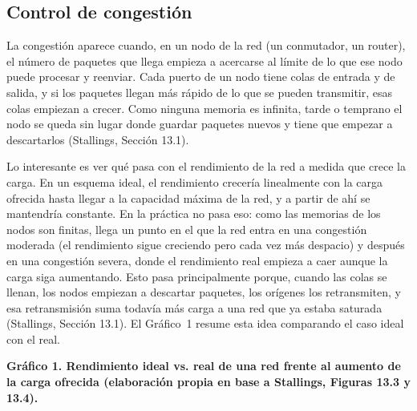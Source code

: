 \documentclass[11pt,a4paper]{article}
\newcommand{\figcaption}[1]{\par\noindent\footnotesize\textbf{#1}\par\vspace{0.4cm}}
\begin{document}
\subsection{Control de congesti\'on}
\label{sec:congestion}

La congesti\'on aparece cuando, en un nodo de la red (un conmutador, un router), el n\'umero de paquetes que llega empieza a acercarse al l\'imite de lo que ese nodo puede procesar y reenviar. Cada puerto de un nodo tiene colas de entrada y de salida, y si los paquetes llegan m\'as r\'apido de lo que se pueden transmitir, esas colas empiezan a crecer. Como ninguna memoria es infinita, tarde o temprano el nodo se queda sin lugar donde guardar paquetes nuevos y tiene que empezar a descartarlos (Stallings, Secci\'on 13.1).

Lo interesante es ver qu\'e pasa con el rendimiento de la red a medida que crece la carga. En un esquema ideal, el rendimiento crecer\'ia linealmente con la carga ofrecida hasta llegar a la capacidad m\'axima de la red, y a partir de ah\'i se mantendr\'ia constante. En la pr\'actica no pasa eso: como las memorias de los nodos son finitas, llega un punto en el que la red entra en una congesti\'on moderada (el rendimiento sigue creciendo pero cada vez m\'as despacio) y despu\'es en una congesti\'on severa, donde el rendimiento real empieza a caer aunque la carga siga aumentando. Esto pasa principalmente porque, cuando las colas se llenan, los nodos empiezan a descartar paquetes, los or\'igenes los retransmiten, y esa retransmisi\'on suma todav\'ia m\'as carga a una red que ya estaba saturada (Stallings, Secci\'on 13.1). El Gr\'afico~1 resume esta idea comparando el caso ideal con el real.

\needspace{1cm}
\begin{center}
\begin{minipage}{0.96\linewidth}
\centering
{}
\figcaption{Gr\'afico 1. Rendimiento ideal vs. real de una red frente al aumento de la carga ofrecida (elaboraci\'on propia en base a Stallings, Figuras 13.3 y 13.4).}
\end{minipage}
\end{center}
\end{document}
